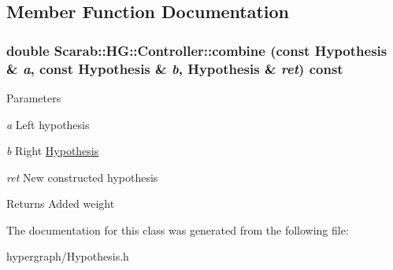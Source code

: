 \subsection{Member Function Documentation}
\hypertarget{classScarab_1_1HG_1_1Controller_a34cfe4b8e7496ffca1cedf64cb3f0a73}{
\subsubsection[{combine}]{\setlength{\rightskip}{0pt plus 5cm}double Scarab::HG::Controller::combine (const {\bf Hypothesis} \& {\em a}, \/  const {\bf Hypothesis} \& {\em b}, \/  {\bf Hypothesis} \& {\em ret}) const}}
\label{classScarab_1_1HG_1_1Controller_a34cfe4b8e7496ffca1cedf64cb3f0a73}

\begin{DoxyParams}{Parameters}
\item[{\em a}]Left hypothesis \item[{\em b}]Right \hyperlink{structScarab_1_1HG_1_1Hypothesis}{Hypothesis} \item[{\em ret}]New constructed hypothesis\end{DoxyParams}
\begin{DoxyReturn}{Returns}
Added weight 
\end{DoxyReturn}


The documentation for this class was generated from the following file:\begin{DoxyCompactItemize}
\item 
hypergraph/Hypothesis.h\end{DoxyCompactItemize}
